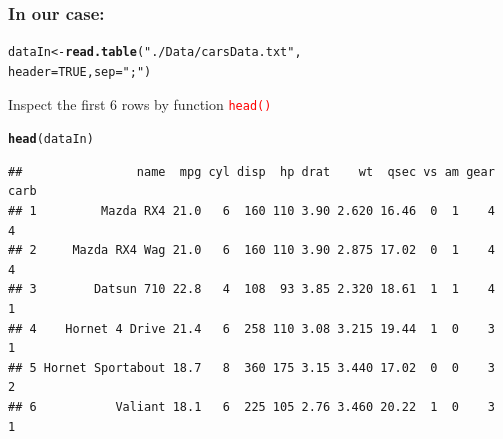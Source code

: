 \documentclass[12pt]{beamer}\usepackage[]{graphicx}\usepackage[]{color}
\makeatletter
\newcommand{\hlnum}[1]{\textcolor[rgb]{0.686,0.059,0.569}{#1}}%
\newcommand{\hlstr}[1]{\textcolor[rgb]{0.192,0.494,0.8}{#1}}%
\newcommand{\hlstd}[1]{\textcolor[rgb]{0.345,0.345,0.345}{#1}}%
\newcommand{\hlkwb}[1]{\textcolor[rgb]{0.69,0.353,0.396}{#1}}%
\newcommand{\hlkwc}[1]{\textcolor[rgb]{0.333,0.667,0.333}{#1}}%
\newcommand{\hlkwd}[1]{\textcolor[rgb]{0.737,0.353,0.396}{\textbf{#1}}}%
\newenvironment{kframe}{%
 \def\at@end@of@kframe{}%
 \ifinner\ifhmode%
  \def\at@end@of@kframe{\end{minipage}}%
  \begin{minipage}{\columnwidth}%
 \fi\fi%
 \def\FrameCommand##1{\hskip\@totalleftmargin \hskip-\fboxsep
 \colorbox{shadecolor}{##1}\hskip-\fboxsep
     \hskip-\linewidth \hskip-\@totalleftmargin \hskip\columnwidth}%
 \MakeFramed {\advance\hsize-\width
   \@totalleftmargin\z@ \linewidth\hsize
   \@setminipage}}%
 {\par\unskip\endMakeFramed%
 \at@end@of@kframe}
\newenvironment{knitrout}{}{} %
\makeatother
\begin{document}
\begin{frame}[fragile]
\frametitle{In our case:}

\begin{knitrout}
\color{fgcolor}\begin{kframe}
\begin{alltt}
\hlstd{dataIn} \hlkwb{<-} \hlkwd{read.table}\hlstd{(}\hlstr{"./Data/carsData.txt"}\hlstd{,}
                      \hlkwc{header} \hlstd{=} \hlnum{TRUE}\hlstd{,} \hlkwc{sep}\hlstd{=}\hlstr{";"}\hlstd{)}
\end{alltt}
\end{kframe}
\end{knitrout}
Inspect the first 6 rows by function \textcolor{red}{\texttt{head()}} 
\begin{knitrout}
\color{fgcolor}\begin{kframe}
\begin{alltt}
\hlkwd{head}\hlstd{(dataIn)}
\end{alltt}
\begin{verbatim}
##                name  mpg cyl disp  hp drat    wt  qsec vs am gear carb
## 1         Mazda RX4 21.0   6  160 110 3.90 2.620 16.46  0  1    4    4
## 2     Mazda RX4 Wag 21.0   6  160 110 3.90 2.875 17.02  0  1    4    4
## 3        Datsun 710 22.8   4  108  93 3.85 2.320 18.61  1  1    4    1
## 4    Hornet 4 Drive 21.4   6  258 110 3.08 3.215 19.44  1  0    3    1
## 5 Hornet Sportabout 18.7   8  360 175 3.15 3.440 17.02  0  0    3    2
## 6           Valiant 18.1   6  225 105 2.76 3.460 20.22  1  0    3    1
\end{verbatim}
\end{kframe}
\end{knitrout}

\end{frame}

\end{document}
